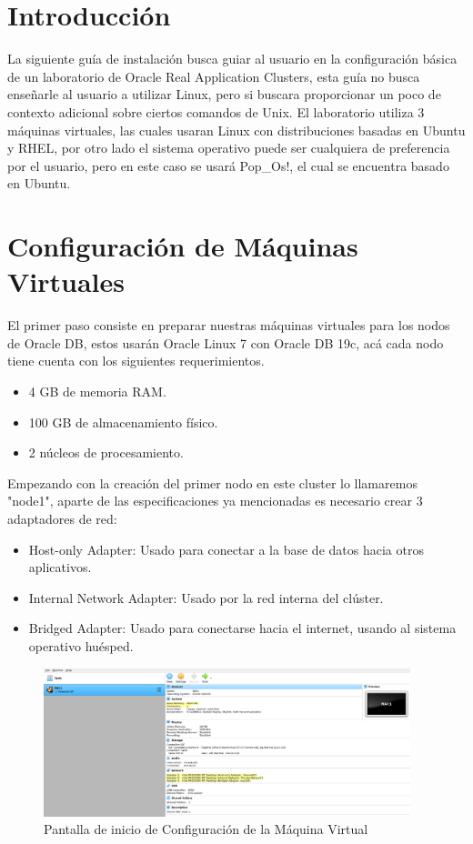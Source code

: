 \documentclass{article}
\begin{document}
\section{Introducción}

La siguiente guía de instalación busca guiar al usuario en la configuración básica de un laboratorio de Oracle Real Application Clusters, esta guía no busca enseñarle al usuario a utilizar Linux, pero si buscara proporcionar un poco de contexto adicional sobre ciertos comandos de Unix. El laboratorio utiliza 3 máquinas virtuales, las cuales usaran Linux con distribuciones basadas en Ubuntu y RHEL, por otro lado el sistema operativo puede ser cualquiera de preferencia por el usuario, pero en este caso se usará Pop\_Os!, el cual se encuentra basado en Ubuntu.

\section{Configuración de Máquinas Virtuales}

El primer paso consiste en preparar nuestras máquinas virtuales para los nodos de Oracle DB, estos usarán Oracle Linux 7 con Oracle DB 19c, acá cada nodo tiene cuenta con los siguientes requerimientos.

\begin{itemize}
    \item 4 GB de memoria RAM.
    \item 100 GB de almacenamiento físico.
    \item 2 núcleos de procesamiento.
\end{itemize}

Empezando con la creación del primer nodo en este cluster lo llamaremos "node1", aparte de las especificaciones ya mencionadas es necesario crear 3 adaptadores de red:

\begin{itemize}
    \item Host-only Adapter: Usado para conectar a la base de datos hacia otros aplicativos. 
    \item Internal Network Adapter: Usado por la red interna del clúster. 
    \item Bridged Adapter: Usado para conectarse hacia el internet, usando al sistema operativo huésped. 
\end{itemize}

\begin{figure}[H]
    \begin{center}
        \includegraphics[width=0.95\textwidth]{vm_base.png}
    \end{center}
    \caption{Pantalla de inicio de Configuración de la Máquina Virtual}
\end{figure}
\end{document}
